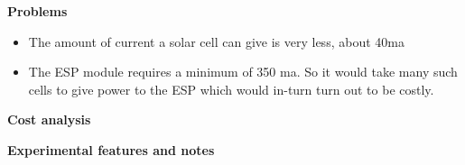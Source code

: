 \documentclass[16pt]{article}
\begin{document}
\textbf{Problems}

\begin{itemize}

\item
  The amount of current a solar cell can give is very less, about 40ma
\item
  The ESP module requires a minimum of 350 ma. So it would take many
  such cells to give power to the ESP which would in-turn turn out to be
  costly.
\end{itemize}

\vspace{10.5cm}

{\LARGE{\textbf{Cost analysis}}}

\vspace{19cm}
{\LARGE{\textbf{Experimental features and notes}}}

\vspace{0.5cm}
\end{document}
